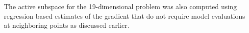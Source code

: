 
The active subspace for the 19-dimensional problem was also computed using regression-based
estimates of the gradient that do not require model evaluations at neighboring points as
discussed earlier.
%
%
%
